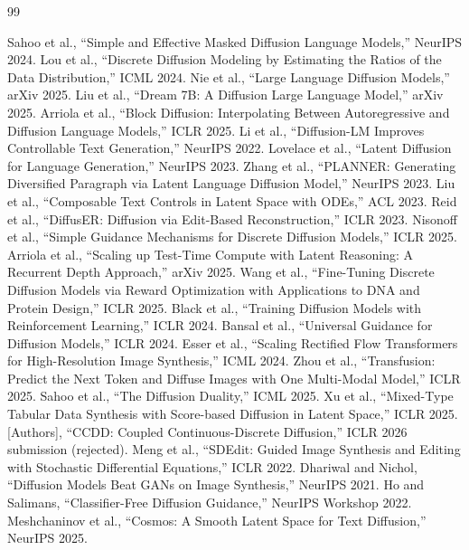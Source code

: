 \documentclass{article}
\begin{document}
\begin{thebibliography}{99}

 Sahoo et al., ``Simple and Effective Masked Diffusion Language Models,'' NeurIPS 2024.
 Lou et al., ``Discrete Diffusion Modeling by Estimating the Ratios of the Data Distribution,'' ICML 2024.
 Nie et al., ``Large Language Diffusion Models,'' arXiv 2025.
 Liu et al., ``Dream 7B: A Diffusion Large Language Model,'' arXiv 2025.
 Arriola et al., ``Block Diffusion: Interpolating Between Autoregressive and Diffusion Language Models,'' ICLR 2025.
 Li et al., ``Diffusion-LM Improves Controllable Text Generation,'' NeurIPS 2022.
 Lovelace et al., ``Latent Diffusion for Language Generation,'' NeurIPS 2023.
 Zhang et al., ``PLANNER: Generating Diversified Paragraph via Latent Language Diffusion Model,'' NeurIPS 2023.
 Liu et al., ``Composable Text Controls in Latent Space with ODEs,'' ACL 2023.
 Reid et al., ``DiffusER: Diffusion via Edit-Based Reconstruction,'' ICLR 2023.
 Nisonoff et al., ``Simple Guidance Mechanisms for Discrete Diffusion Models,'' ICLR 2025.
 Arriola et al., ``Scaling up Test-Time Compute with Latent Reasoning: A Recurrent Depth Approach,'' arXiv 2025.
 Wang et al., ``Fine-Tuning Discrete Diffusion Models via Reward Optimization with Applications to DNA and Protein Design,'' ICLR 2025.
 Black et al., ``Training Diffusion Models with Reinforcement Learning,'' ICLR 2024.
 Bansal et al., ``Universal Guidance for Diffusion Models,'' ICLR 2024.
 Esser et al., ``Scaling Rectified Flow Transformers for High-Resolution Image Synthesis,'' ICML 2024.
 Zhou et al., ``Transfusion: Predict the Next Token and Diffuse Images with One Multi-Modal Model,'' ICLR 2025.
 Sahoo et al., ``The Diffusion Duality,'' ICML 2025.
 Xu et al., ``Mixed-Type Tabular Data Synthesis with Score-based Diffusion in Latent Space,'' ICLR 2025.
 [Authors], ``CCDD: Coupled Continuous-Discrete Diffusion,'' ICLR 2026 submission (rejected).
 Meng et al., ``SDEdit: Guided Image Synthesis and Editing with Stochastic Differential Equations,'' ICLR 2022.
 Dhariwal and Nichol, ``Diffusion Models Beat GANs on Image Synthesis,'' NeurIPS 2021.
 Ho and Salimans, ``Classifier-Free Diffusion Guidance,'' NeurIPS Workshop 2022.
 Meshchaninov et al., ``Cosmos: A Smooth Latent Space for Text Diffusion,'' NeurIPS 2025.

\end{thebibliography}
\end{document}
